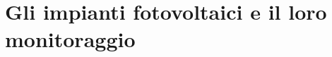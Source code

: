 \clearpage{\pagestyle{empty}\cleardoublepage}
\chapter{Gli impianti fotovoltaici e il loro monitoraggio}
